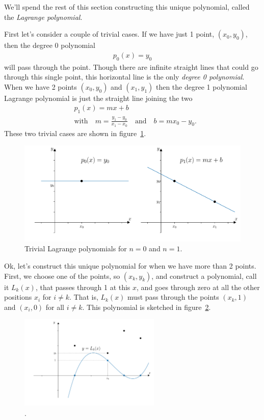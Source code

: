 We'll spend the rest of this section constructing this unique polynomial, called the \textit{Lagrange polynomial}.

First let's consider a couple of trivial cases. If we have just 1 point, $(x_0,y_0)$, then the degree 0 polynomial
\begin{align*}
p_0(x) = y_0
\end{align*}
will pass through the point. Though there are infinite straight lines that could go through this single point, this horizontal line is the only \textit{degree 0 polynomial}. When we have 2 points $(x_0,y_0)$ and $(x_1,y_1)$ then the degree 1 polynomial Lagrange polynomial is just the straight line joining the two
\begin{align*}
& p_1(x) = mx + b \\
& \text{with} \quad m = \frac{y_1 - y_0}{x_1 - x_0} \quad \text{and} \quad  b = m x_0 - y_0.
\end{align*}
These two trivial cases are shown in figure~\ref{fig:ch3_lagrange_n0_n1}.
\begin{figure}[H]
	\begin{center}
	\includegraphics[width=\textwidth]{figures/ch3_lagrange_n0_n1.pdf} 
	  \caption{Trivial Lagrange polynomials for $n=0$ and $n=1$.} \label{fig:ch3_lagrange_n0_n1}
	\end{center}
\end{figure}

Ok, let's construct this unique polynomial for when we have more than 2 points. First, we choose one of the points, so $(x_k, y_k)$, and construct a polynomial, call it $L_k(x)$, that passes through 1 at this $x$, and goes through zero at all the other positions $x_i$ for $i\neq k$. That is, $L_k(x)$ must pass through the points $(x_k,1)$ and $(x_i,0)$ for all $i\neq k$. This polynomial is sketched in figure~\ref{fig:ch3_lagrange_Lk}.
\begin{figure}[H]
	\begin{center}
	\includegraphics[width=0.6\textwidth]{figures/ch3_lagrange_Lk.pdf} 
	  \caption{.} \label{fig:ch3_lagrange_Lk}
	\end{center}
\end{figure}

